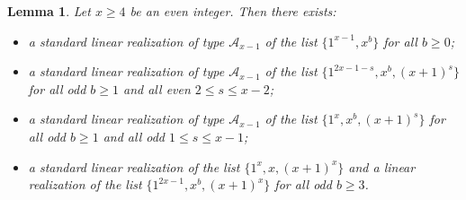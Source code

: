 \documentclass{amsart}
\newtheorem{lem}[prop]{Lemma}
\theoremstyle{definition}
\numberwithin{equation}{section}
\def\A{\mathcal{A}}
\begin{document}
\begin{lem}\label{even2}
Let $x\geq 4$ be an even integer. Then there exists:
\begin{itemize}
\item[(1)] a standard linear realization of type $\A_{x-1}$ of the list $\{1^{x-1}, x^b \}$ for all $b\geq 0$;
\item[(2)] a standard linear realization of type $\A_{x-1}$ of the list $\{1^{2x-1-s}, x^b, (x+1)^s\}$ for all odd $b\geq 1$
and all even $2\leq s \leq x-2$;
\item[(3)] a standard linear realization of type $\A_{x-1}$ of the list $\{1^{x}, x^b, (x+1)^s\}$ for all odd $b\geq 1$
and all odd $1\leq  s\leq x-1$;
\item[(4)] a standard linear realization of the list $\{1^{x}, x, (x+1)^x \}$ and a linear realization of the list
$\{1^{2x-1}, x^b,(x+1)^x \}$ for all odd $b\geq 3$.
\end{itemize}
\end{lem}
\end{document}
